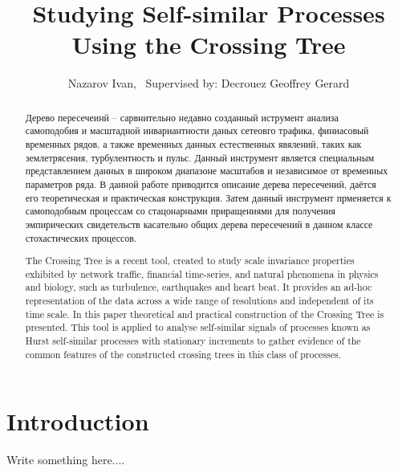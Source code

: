 \documentclass[a4paper,14pt]{extreport}
\title{Studying Self-similar Processes Using the Crossing Tree}
\author{Nazarov Ivan, \rus{101мНОД(ИССА)}\
	{\small Supervised by: Decrouez Geoffrey Gerard}}
\begin{document}

\clearpage


\clearpage

\begin{abstract}
Дерево пересечеинй -- сарвнительно недавно созданный иструмент анализа самоподобия
и масштадной инвариантности даных сетеовго трафика, финиасовый временных рядов, а
также временных данных естественных явялений, таких как землетрясения, турбулентность
и пульс. Данный инструмент является специальным представлением данных в широком
диапазоне масштабов и независимое от временных параметров ряда. В данной работе
приводится описание дерева пересечений, даётся его теоретическая и практическая
конструкция. Затем данный инструмент прменяется к самоподобным процессам со стацонарными
приращениями для получения эмпирических свидетельств касательно общих 
дерева пересечений в данном классе стохастических процессов.
\end{abstract}

\begin{abstract}
The Crossing Tree is a recent tool, created to study scale invariance properties
exhibited by network traffic, financial time-series, and natural phenomena in physics
and biology, such as turbulence, earthquakes and heart beat. It provides an ad-hoc
representation of the data across a wide range of resolutions and independent of
its time scale. In this paper theoretical and practical construction of the Crossing
Tree is presented. This tool is applied to analyse self-similar signals of processes
known as Hurst self-similar processes with stationary increments to gather evidence 
of the common features of the constructed crossing trees in this class of processes.
\end{abstract}

\tableofcontents
\clearpage
{}


\chapter{Introduction} %
\label{cha:introduction}

Write something here....

\end{document}
